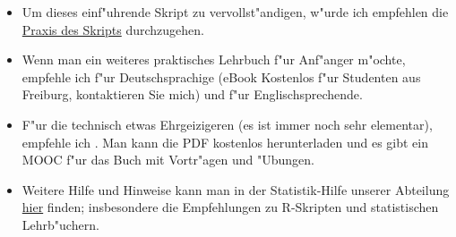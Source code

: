 \documentclass[a4paper,twoside]{tufte-book}\usepackage[]{graphicx}\usepackage[]{color}
\begin{document}
\begin{itemize}

\item Um dieses einf"uhrende Skript zu vervollst"andigen, w"urde ich empfehlen die \href{https://github.com/florianhartig/ResearchSkills/tree/master/Labs/Statistics}{Praxis des Skripts} durchzugehen.

\item Wenn man ein weiteres praktisches Lehrbuch f"ur Anf"anger m"ochte, empfehle ich \citet{Dormann-ParametrischeStatistik-2013} f"ur Deutschsprachige (eBook Kostenlos f"ur Studenten aus Freiburg, kontaktieren Sie mich) und \citet{Gotelli-PrimerEcologicalStatistics-2004} f"ur Englischsprechende. 

\item F"ur die technisch etwas Ehrgeizigeren (es ist immer noch sehr elementar), empfehle ich \citet{James-IntroductiontoStatistical-2013}. Man kann die PDF kostenlos herunterladen und es gibt ein MOOC f"ur das Buch mit Vortr"agen und "Ubungen.

\item Weitere Hilfe und Hinweise kann man in der Statistik-Hilfe unserer Abteilung  \href{http://biometry.github.io/APES/}{hier} finden; insbesondere die Empfehlungen zu R-Skripten und statistischen Lehrb"uchern.

\end{itemize}






\end{document}

